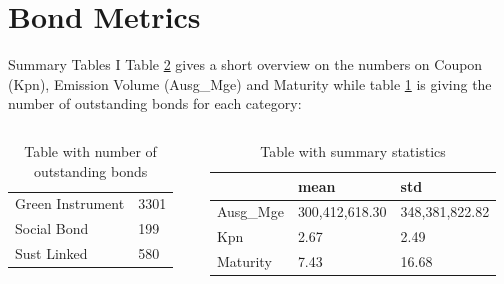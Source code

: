 \documentclass[
	8pt, %
]{beamer}
\begin{document}
\section{Bond Metrics}
    \begin{frame}{Summary Tables I}
    Table \ref{table:2} gives a short overview on the numbers on Coupon (Kpn), Emission Volume (Ausg\_Mge) and Maturity while table \ref{table:1} is giving the number of outstanding bonds for each category:
        \begin{columns}[c]
            \begin{column}{0.4\textwidth}
                \begin{table}[htbp]
                \centering
                \begin{tabular}{ll}
                \toprule
                Green Instrument & 3301 \\
                Social Bond & 199 \\
                Sust Linked & 580 \\
                \bottomrule
                \end{tabular}
                \caption{Table with number of outstanding bonds}
                \label{table:1}
                \end{table}
                \end{column}
            \begin{column}{0.6\textwidth}
                \begin{table}[htbp]
                \centering
                \begin{tabular}{lll}
                \toprule
                {} & mean & std \\
                \midrule
                Ausg\_Mge & 300,412,618.30 & 348,381,822.82 \\
                Kpn & 2.67 & 2.49 \\
                Maturity & 7.43 & 16.68 \\
                \bottomrule
                \end{tabular}
                \caption{Table with summary statistics}
                \label{table:2}
                \end{table}
            \end{column}
    
    \end{columns}
\end{frame}
\end{document}
